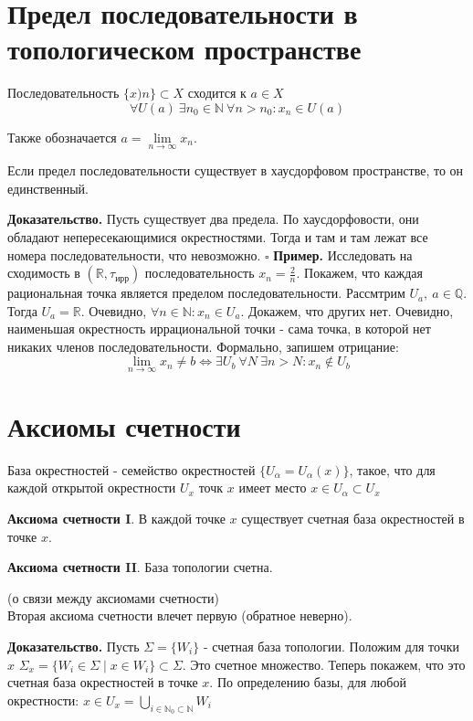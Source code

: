 \section{Предел последовательности в топологическом пространстве}
\begin{defin}
    Последовательность $\{x)n\}\subset X$ сходится к $a\in X$
$$\forall U(a)~\exists n_0\in \mathbb{N}~\forall n>n_0:x_n\in U(a)$$
\end{defin}
Также обозначается $a=\lim\limits_{n\to\infty}x_n$. 
\begin{theor}
Если предел последовательности существует в хаусдорфовом пространстве, 
то он единственный. 
\end{theor}
\textbf{Доказательство.}  Пусть существует два предела. По хаусдорфовости, 
они обладают непересекающимися окрестностями. Тогда и там и там лежат все 
номера последовательности, что невозможно. 
$\square$ 
\textbf{Пример.} Исследовать на сходимость в 
$(\mathbb{R},\tau_\text{ирр})$ последовательность $x_n=\frac{2}{n}$. 
Покажем, что каждая рациональная точка является пределом последовательности. 
Рассмтрим $U_a,~a\in \mathbb{Q}$. Тогда $U_a=\mathbb{R}$. Очевидно,
$\forall n\in \mathbb{N}:x_n\in U_a$. Докажем, что других нет. Очевидно,
наименьшая окрестность иррациональной точки - сама точка, в которой нет 
никаких членов последовательности. Формально, запишем отрицание:
$$\lim\limits_{n \to \infty} x_n\ne b\iff \exists U_b~\forall N~\exists n>N:
x_n\notin U_b$$ 
\section{Аксиомы счетности}
\begin{defin}
База окрестностей - семейство окрестностей $\{U_\alpha=U_\alpha(x)\}$, 
такое, что для каждой открытой окрестности $U_x$ точк $x$ имеет место
$x\in U_\alpha\subset U_x$
\end{defin}
\begin{defin}
\textbf{Аксиома счетности I}. В каждой точке $x$ существует счетная база
окрестностей в точке  $x$.
\end{defin}
\begin{defin}
\textbf{Аксиома счетности II}. База топологии счетна.
\end{defin}
\begin{theor}
    (о связи между аксиомами счетности)\\
    Вторая аксиома счетности влечет первую (обратное неверно).
\end{theor}
\textbf{Доказательство.} Пусть $\Sigma=\{W_i\}$ - счетная база топологии.
Положим для точки $x$  $\Sigma_x=\{W_i\in\Sigma\mid x\in W_i\}\subset\Sigma$.
Это счетное множество. Теперь покажем, что это счетная 
база окрестностей в точке
$x$. По определению базы, для любой окрестности: 
$x\in U_x=\bigcup\limits_{i\in \mathbb{N}_0\subset \mathbb{N}}W_i$

